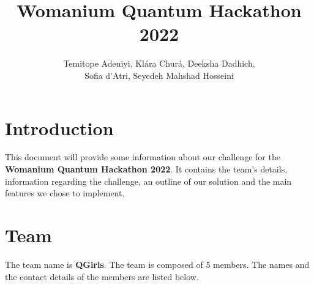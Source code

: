 \documentclass[hidelinks, a4paper,12pt]{article}
\title{Womanium Quantum Hackathon 2022}
\author{Temitope Adeniyi, Klára Churá, Deeksha Dadhich,\\Sofia d'Atri, Seyedeh Mahshad Hosseini}
\date{}
\begin{document}
\maketitle

\tableofcontents

\newpage
\section{Introduction}
This document will provide some information about our challenge for the \textbf{Womanium Quantum Hackathon 2022}. It contains the team's details, information regarding the challenge, an outline of our solution and the main features we chose to implement.

\section{Team}
The team name is \textbf{QGirls}. The team is composed of 5 members. The names and the contact details of the members are listed below.\\
\end{document}
